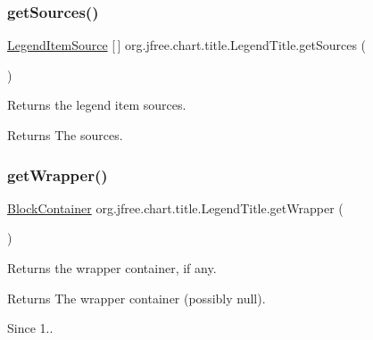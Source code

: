 \subsubsection{\texorpdfstring{get\+Sources()}{getSources()}}
{\footnotesize\ttfamily \mbox{\hyperlink{interfaceorg_1_1jfree_1_1chart_1_1_legend_item_source}{Legend\+Item\+Source}} \mbox{[}$\,$\mbox{]} org.\+jfree.\+chart.\+title.\+Legend\+Title.\+get\+Sources (\begin{DoxyParamCaption}{ }\end{DoxyParamCaption})}

Returns the legend item sources.

\begin{DoxyReturn}{Returns}
The sources. 
\end{DoxyReturn}
\mbox{\label{classorg_1_1jfree_1_1chart_1_1title_1_1_legend_title_a526c82877fdb5a1dd842e012434ee418}} 
\subsubsection{\texorpdfstring{get\+Wrapper()}{getWrapper()}}
{\footnotesize\ttfamily \mbox{\hyperlink{classorg_1_1jfree_1_1chart_1_1block_1_1_block_container}{Block\+Container}} org.\+jfree.\+chart.\+title.\+Legend\+Title.\+get\+Wrapper (\begin{DoxyParamCaption}{ }\end{DoxyParamCaption})}

Returns the wrapper container, if any.

\begin{DoxyReturn}{Returns}
The wrapper container (possibly {\ttfamily null}).
\end{DoxyReturn}
\begin{DoxySince}{Since}
1.. 
\end{DoxySince}
\mbox{\label{classorg_1_1jfree_1_1chart_1_1title_1_1_legend_title_a0f9b542e92438cebe2c7fe107ef957f6}} 
